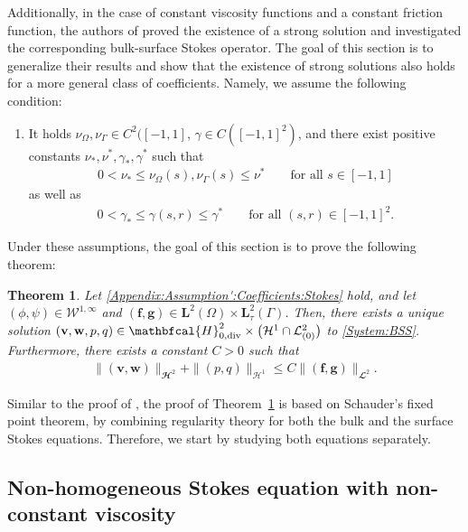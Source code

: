 \documentclass[10pt,reqno]{amsart}
\newtheorem{theorem}{Theorem}[section]
\theoremstyle{remark}
\numberwithin{equation}{section}
\newcommand{\norm}[1]{\| #1 \|}
\newcommand{\bv}{\mathbf{v}}
\newcommand{\bw}{\mathbf{w}}
\newcommand{\f}{\mathbf{f}}
\newcommand{\g}{\mathbf{g}}
\newcommand{\Div}{\textnormal{div}}
\newcommand{\Om}{\Omega}
\newcommand{\Ga}{\Gamma}
\begin{document}
Additionally, in the case of constant viscosity functions and a constant friction function, the authors of \cite{Knopf2025a} proved the existence of a strong solution and investigated the corresponding bulk-surface Stokes operator. The goal of this section is to generalize their results and show that the existence of strong solutions also holds for a more general class of coefficients. Namely, we assume the following condition:
\begin{enumerate}[label=\textnormal{\bfseries(A)$^\prime$}]
    \item \label{Appendix:Assumption':Coefficients:Stokes} It holds $\nu_\Om,\nu_\Ga\in C^2([-1,1]$, $\gamma\in C([-1,1]^2)$, and there exist positive constants $\nu_\ast,\nu^\ast,\gamma_\ast, \gamma^\ast$ such that
    \begin{align}\label{Appendix:Assumption':Bound}
        0 < \nu_\ast \leq \nu_\Om(s), \nu_\Ga(s) \leq \nu^\ast \qquad\text{for all~}s\in[-1,1]
    \end{align}
    as well as
    \begin{align*}
        0 < \gamma_\ast \leq \gamma(s,r) \leq \gamma^\ast \qquad\text{for all~}(s,r)\in[-1,1]^2.
    \end{align*}
\end{enumerate}
Under these assumptions, the goal of this section is to prove the following theorem:
\begin{theorem}\label{App:Theorem:BulkSurfaceStokes:SS}
    Let \ref{Appendix:Assumption':Coefficients:Stokes} hold, and let $(\phi,\psi)\in \mathcal{W}^{1,\infty}$ and $(\f,\g)\in\mathbf{L}^2(\Om)\times\mathbf{L}^2_\tau(\Ga)$. Then, there exists a unique solution $(\bv,\bw,p,q)\in\mathbfcal{H}^2_{0,\Div}\times\big(\mathcal{H}^1\cap\mathcal{L}^2_{(0)}\big)$ to \eqref{System:BSS}. Furthermore, there exists a constant $C > 0$ such that
    \begin{align}\label{App:Est:BulkSurfaceStokes}
        \norm{(\bv,\bw)}_{\mathbfcal{H}^2} + \norm{(p,q)}_{\mathcal{H}^1} \leq C\norm{(\f,\g)}_{\mathbfcal{L}^2}.
    \end{align}
\end{theorem}

Similar to the proof of \cite[Theorem~5.9]{Knopf2025a}, the proof of Theorem~\ref{App:Theorem:BulkSurfaceStokes:SS} is based on Schauder's fixed point theorem, by combining regularity theory for both the bulk and the surface Stokes equations. Therefore, we start by studying both equations separately.


\subsection{Non-homogeneous Stokes equation with non-constant viscosity}
\end{document}
